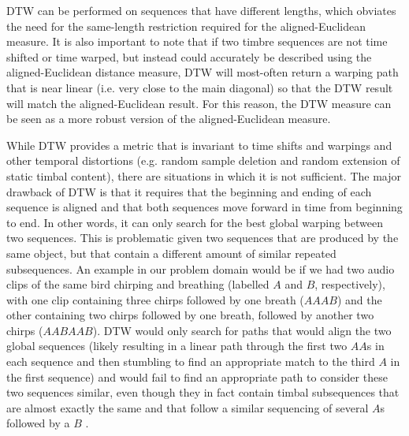 \documentclass[a4paper,12pt]{report} 	%
\numberwithin{figure}{chapter}
\numberwithin{table}{chapter}
\numberwithin{equation}{chapter}
\begin{document}
\begin{flushleft}
DTW can be performed on sequences that have different lengths, which obviates the need for the same-length restriction required for the aligned-Euclidean measure. It is also important to note that if two timbre sequences are not time shifted or time warped, but instead could accurately be described using the aligned-Euclidean distance measure, DTW will most-often return a warping path that is near linear (i.e. very close to the main diagonal) so that the DTW result will match the aligned-Euclidean result. For this reason, the DTW measure can be seen as a more robust version of the aligned-Euclidean measure.

While DTW provides a metric that is invariant to time shifts and warpings and other temporal distortions (e.g. random sample deletion and random extension of static timbal content), there are situations in which it is not sufficient. The major drawback of DTW is that it requires that the beginning and ending of each sequence is aligned and that both sequences move forward in time from beginning to end. In other words, it can only search for the best global warping between two sequences. This is problematic given two sequences that are produced by the same object, but that contain a different amount of similar repeated subsequences. An example in our problem domain would be if we had two audio clips of the same bird chirping and breathing (labelled $A$ and $B$, respectively), with one clip containing three chirps followed by one breath ($AAAB$) and the other containing two chirps followed by one breath, followed by another two chirps ($AABAAB$). DTW would only search for paths that would align the two global sequences (likely resulting in a linear path through the first two $AA$s in each sequence and then stumbling to find an appropriate match to the third $A$ in the first sequence) and would fail to find an appropriate path to consider these two sequences similar, even though they in fact contain timbal subsequences that are almost exactly the same and that follow a similar sequencing of several $A$s followed by a $B$ \cite[p. 1143]{serra2008chroma}.


\end{flushleft}
\end{document}

